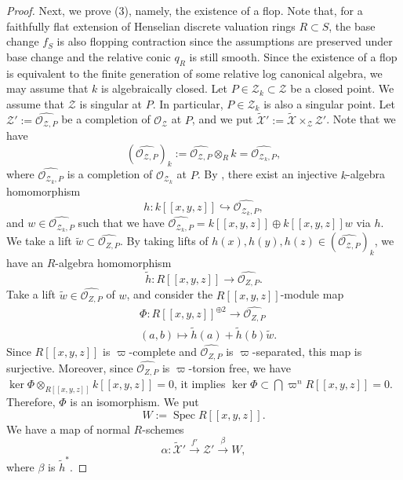 \documentclass[autodetect-engine, a4paper]{amsart}
\theoremstyle{definition}
\def\cO{\mathcal{O}}
\DeclareMathOperator\Spec{\mathrm{Spec}}
\begin{document}
\begin{proof}
Next, we prove (3), namely, the existence of a flop.
Note that, for a faithfully flat extension of Henselian discrete valuation rings $R \subset S$, the base change $f_{S}$ is also flopping contraction since the assumptions are preserved under base change and the relative conic $q_{R}$ is still smooth.
Since the existence of a flop is equivalent to the finite generation of some relative log canonical algebra, we may assume that $k$ is algebraically closed.
Let $P \in \mathcal{Z}_{k} \subset \mathcal{Z}$ be a closed point. We assume that $\mathcal{Z}$ is singular at $P$. In particular, $P \in \mathcal{Z}_{k}$ is also a singular point. 
Let $\mathcal{Z}':= \widehat{\cO_{\mathcal{Z},P}}$ be a completion of $\cO_{\mathcal{Z}}$ at $P$, and we put $\widetilde{\mathcal{X}}' := \widetilde{\mathcal{X}} \times_{\mathcal{Z}} \mathcal{Z}'$.
Note that we have
\[
(\widehat{\cO_{\mathcal{Z},P}})_{k} := \widehat{\cO_{\mathcal{Z},P}} \otimes_{R} k = \widehat{\cO_{\mathcal{Z}_{k},P}},
\]
where $\widehat{\cO_{\mathcal{Z}_{k},P}}$ is a completion of $\cO_{\mathcal{Z}_{k}}$ at $P$.
By \cite[Lemma 6.12]{Tanakaflop},
there exist an injective $k$-algebra homomorphism
\[
 h \colon
 k[[x,y,z]] \hookrightarrow \widehat{\cO_{\mathcal{Z}_{k},P}},
\]
and $w \in \widehat{\cO_{\mathcal{Z}_{k},P}}$ such that we have $\widehat{\cO_{\mathcal{Z}_{k},P}} = k[[x,y,z]] \oplus k[[x,y,z]]w$ via $h$.
We take a lift $\widetilde{w} \subset \widehat{\cO_{Z,P}}$.
By taking lifts of $h(x), h(y), h(z) \in (\widehat{\cO_{\mathcal{Z},P}})_k$, we have an $R$-algebra homomorphism
\[
\widetilde{h} \colon R[[x,y,z]] \rightarrow  \widehat{\cO_{Z,P}}.
\]
Take a lift $\widetilde{w} \in \widehat{\cO_{Z,P}}$ of $w$, and consider the $R[[x,y,z]]$-module map
\begin{align*}
&\Phi\colon R[[x,y,z]]^{\oplus 2} \rightarrow \widehat{\cO_{Z,P}} \\
& (a,b) \mapsto \widetilde{h} (a) + \widetilde{h}(b)\widetilde{w}.
\end{align*}
Since $R[[x,y,z]]$ is $\varpi$-complete and $\widehat{\cO_{Z,P}}$ is $\varpi$-separated, this map is surjective.
Moreover, since $\widehat{\cO_{Z,P}}$ is $\varpi$-torsion free, we have $\ker \Phi \otimes_{R[[x,y,z]]} k[[x,y,z]] =0$, it implies $\ker \Phi \subset \bigcap \varpi^n R[[x,y,z]] =0$.
Therefore, $\Phi$ is an isomorphism.
We put 
\[
W := \Spec R[[x,y,z]].
\]
We have a map of normal $R$-schemes
\[
\alpha \colon
\widetilde{\mathcal{X}}' \xrightarrow{f'}
\mathcal{Z}' 
\xrightarrow{\beta}
W,
\]
where $\beta$ is $\widetilde{h}^{\ast}$.


\end{proof}
\end{document}
